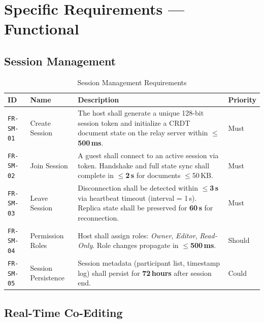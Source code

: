 \documentclass[12pt, a4paper, oneside]{article}
\newcommand{\reqid}[1]{\texttt{\textcolor{primaryblue}{#1}}}
\newcommand{\metric}[1]{\textbf{\textcolor{accentgreen}{#1}}}
\begin{document}
\section{Specific Requirements --- Functional}

\subsection{Session Management}

\begin{table}[H]
\centering
\caption{Session Management Requirements}
\begin{tabularx}{\textwidth}{l l X l}
\toprule
\textbf{ID} & \textbf{Name} & \textbf{Description} & \textbf{Priority} \\
\midrule
\reqid{FR-SM-01} & Create Session & The host shall generate a unique 128-bit session token and initialize a CRDT document state on the relay server within \metric{$\leq$500\,ms}. & Must \\
\reqid{FR-SM-02} & Join Session & A guest shall connect to an active session via token. Handshake and full state sync shall complete in \metric{$\leq$2\,s} for documents $\leq$50\,KB. & Must \\
\reqid{FR-SM-03} & Leave Session & Disconnection shall be detected within \metric{$\leq$3\,s} via heartbeat timeout (interval = 1\,s). Replica state shall be preserved for \metric{60\,s} for reconnection. & Must \\
\reqid{FR-SM-04} & Permission Roles & Host shall assign roles: \textit{Owner}, \textit{Editor}, \textit{Read-Only}. Role changes propagate in \metric{$\leq$500\,ms}. & Should \\
\reqid{FR-SM-05} & Session Persistence & Session metadata (participant list, timestamp log) shall persist for \metric{72\,hours} after session end. & Could \\
\bottomrule
\end{tabularx}
\end{table}

\subsection{Real-Time Co-Editing}
\end{document}

